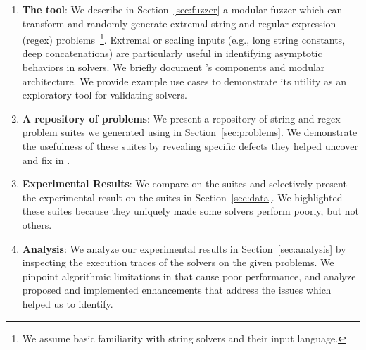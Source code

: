 \begin{enumerate}
\item \textbf{The \fuzzer{} tool}: We describe in
    Section~\ref{sec:fuzzer} a modular fuzzer which can transform and
    randomly generate extremal \smtfull{} string and regular expression
    (regex) problems~\footnote{We assume basic
    familiarity with string solvers and their input
    language.}. Extremal or scaling inputs (e.g., long string
    constants, deep concatenations) are particularly useful in
    identifying asymptotic behaviors in solvers. We briefly document \fuzzer{}'s
    components and modular architecture. We provide example use cases to
    demonstrate its utility as an exploratory tool for validating
    solvers.

\item \textbf{A repository of \smtfull{} problems}: We present a
    repository of \smtfull{} string and regex problem suites we
    generated using \fuzzer{} in Section~\ref{sec:problems}. We
    demonstrate the usefulness of these suites by revealing specific
    defects they helped uncover and fix in \us{}.

\item \textbf{Experimental Results}: We compare \theSolvers{} on the
    \fuzzer{} suites and selectively present the experimental result on
    the suites \theSuites{} in Section~\ref{sec:data}. We highlighted
    these suites because they uniquely made some solvers perform poorly,
    but not others.

\item \textbf{Analysis}: We analyze our experimental results in
    Section~\ref{sec:analysis} by inspecting the execution traces of the
    solvers on the given problems. We pinpoint algorithmic limitations
    in \us{} that cause poor performance, and analyze proposed and
    implemented enhancements that address the issues which \fuzzer{}
    helped us to identify.
\end{enumerate}
